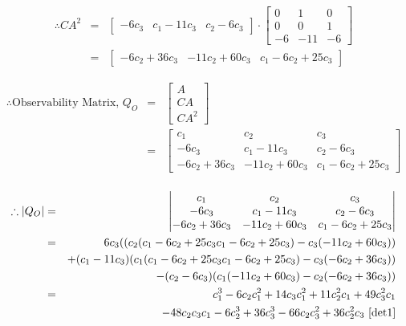 \documentclass[12pt,technote,a4paper,onecolumn]{IEEEtran}
\begin{document}
\begin{eqnarray} %
\therefore CA^2 &=&
	\begin{bmatrix}
	-6c_3 & c_1 - 11 c_3 & c_2 - 6 c_3
	\end{bmatrix}
	\cdot
	\begin{bmatrix}
		0 & 1 & 0 \\
		0 & 0 & 1 \\
		-6 & -11 &  -6
	\end{bmatrix} \nonumber\\
	&=& \begin{bmatrix}
	-6 c_2 + 36 c_3 & -11 c_2 + 60 c_3 & c_1 - 6 c_2 + 25 c_3 
	\end{bmatrix}
\end{eqnarray}

\begin{eqnarray} %
\therefore \text{Observability Matrix, }  Q_O &=&
	\begin{bmatrix}
	A\\CA\\CA^2
	\end{bmatrix} \nonumber\\
	&=& \begin{bmatrix}
		c_1 & c_2 & c_3\\
		-6c_3 & c_1 - 11 c_3 & c_2 - 6 c_3\\
		-6 c_2 + 36 c_3 & -11 c_2 + 60 c_3 & c_1 - 6 c_2 + 25 c_3
	\end{bmatrix}\\
\end{eqnarray}

\begin{eqnarray}
\therefore |Q_O| &=&
	\left| \begin{matrix}
		c_1 & c_2 & c_3\\
		-6c_3 & c_1 - 11 c_3 & c_2 - 6 c_3\\
		-6 c_2 + 36 c_3 & -11 c_2 + 60 c_3 & c_1 - 6 c_2 + 25 c_3
	\end{matrix} \right| \\ 
	&=& 6c_3 ((c_2 (c_1 - 6 c_2 + 25 c_3c_1 - 6 c_2 + 25 c_3) - c_3(-11 c_2 + 60 c_3)) \nonumber\\
	&&+( c_1 - 11 c_3)(c_1(c_1 - 6 c_2 + 25 c_3c_1 - 6 c_2 + 25 c_3) - c_3 (-6 c_2 + 36 c_3)) \nonumber\\
	&&-(c_2 - 6 c_3)(c_1(-11 c_2 + 60 c_3 ) - c_2(-6 c_2 + 36 c_3)) \label{eq:1}\\
	&=& c_1^3 - 6 c_2 c_1^2 + 14 c_3 c_1^2 + 11 c_2^2 c_1 + 49 c_3^2 c_1 \nonumber\\
	&&- 48 c_2 c_3 c_1 - 6 c_2^3 + 36 c_3^3 - 66 c_2 c_3^2 + 36 c_2^2 c_3 \text{~\cite{det1}}
\end{eqnarray}
\end{document}
